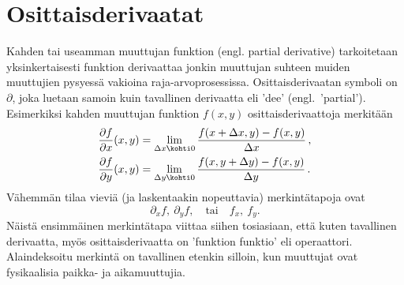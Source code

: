 \section{Osittaisderivaatat} \label{osittaisderivaatat}
\alku
{}

Kahden tai useamman muuttujan funktion  (engl. partial derivative) 
tarkoitetaan yksinkertaisesti funktion derivaattaa jonkin muuttujan suhteen muiden muuttujien
pysyessä vakioina raja-arvoprosessissa. Osittaisderivaatan symboli on $\partial$, joka luetaan
samoin kuin tavallinen derivaatta eli 'dee' (engl.\ 'partial'). Esimerkiksi kahden muuttujan
funktion $f(x,y)$ osittaisderivaattoja merkitään
\begin{align*}
\frac{\partial f}{\partial x} (x,y) 
         &= \lim_{\Delta x\kohti 0} \frac{f(x+\Delta x,y)-f(x,y)}{\Delta x}\,, \\
\frac{\partial f}{\partial y} (x,y) 
         &= \lim_{\Delta y\kohti 0} \frac{f(x,y+\Delta y)-f(x,y)}{\Delta y}\,.
\end{align*}
Vähemmän tilaa vieviä (ja laskentaakin nopeuttavia) merkintätapoja ovat
\[
\partial_x f, \ \partial_y f,\quad \text{tai} \quad f_x, \ f_y.
\]
Näistä ensimmäinen merkintätapa viittaa siihen tosiasiaan, että kuten tavallinen derivaatta,
myös osittaisderivaatta on 'funktion funktio' eli operaattori. \mbox{Alaindeksoitu} merkintä on 
tavallinen etenkin silloin, kun muuttujat ovat fysikaalisia paikka- ja aikamuuttujia.

